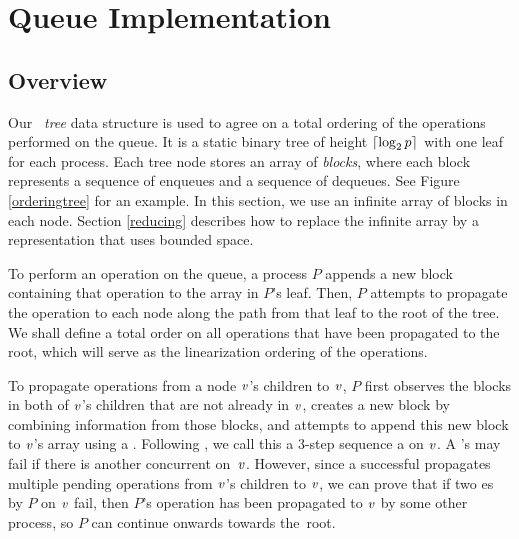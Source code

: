 
\section{Queue Implementation} \label{DescriptQ}

\subsection{Overview}
Our \emph{\ordering\ tree} data structure is used to agree on a total ordering of the operations performed on the queue.
It is a static binary tree of height $\lceil \log_2 p \rceil$ with one leaf 
for each process. 
Each tree node  stores an array of \emph{blocks}, where each block represents a 
sequence of enqueues and a sequence of dequeues.
See Figure \ref{orderingtree} for an example.
In this section, we use an infinite array of blocks in each node.
Section \ref{reducing} describes how to replace the infinite array by a representation that uses bounded space.

To perform an operation on the queue, a process $P$ appends a new block containing that  
operation to the  array in $P$'s leaf.
Then, $P$ attempts to propagate the operation to each node along the path from that leaf to the root of the tree.
We shall define a total order on all operations that have been propagated to the root, which 
will serve as the linearization ordering of the operations.

To propagate operations from a node $\mbox{\textnormal{\textit{v}}}$'s children to $\mbox{\textnormal{\textit{v}}}$, $P$ first observes
the blocks in both of $\mbox{\textnormal{\textit{v}}}$'s children that are not already in $\mbox{\textnormal{\textit{v}}}$,
creates a new block by combining information from those blocks, and attempts to append this 
new block to $\mbox{\textnormal{\textit{v}}}$'s  array using a .
Following \cite{DBLP:conf/fsttcs/JayantiP05}, we call this a 3-step sequence a
 on $\mbox{\textnormal{\textit{v}}}$. %
A 's  may fail if there is another concurrent  on~$\mbox{\textnormal{\textit{v}}}$.
However, since a successful  propagates multiple pending operations 
from $\mbox{\textnormal{\textit{v}}}$'s children to $\mbox{\textnormal{\textit{v}}}$,
we can prove that if two es by $P$ on $\mbox{\textnormal{\textit{v}}}$ fail,
then $P$'s operation has been propagated to $\mbox{\textnormal{\textit{v}}}$ by some other process, so $P$ can continue 
onwards towards the~root.

